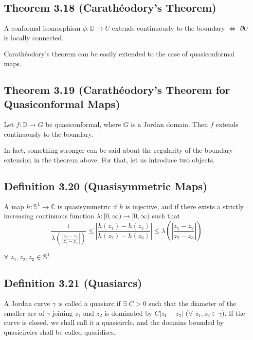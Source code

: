 \documentclass[11pt,a4paper]{article}
\begin{document}
        \subsection*{Theorem 3.18 (Carath\'eodory's Theorem)} A conformal isomorphism $\phi: \mathbb{D} \rightarrow U$ extends continuously to the boundary $\iff$ $\partial U$ is locally connected.



        Carath\'eodory's theorem can be easily extended to the case of quasiconformal maps.

        \subsection*{Theorem 3.19 (Carath\'eodory's Theorem for Quasiconformal Maps)} Let $f:\mathbb{D}\rightarrow G$ be quasiconformal, where $G$ is a Jordan domain. Then $f$ extends continuously to the boundary.



        In fact, something stronger can be said about the regularity of the boundary extension in the theorem above. For that, let us introduce two objects.

        \subsection*{Definition 3.20 (Quasisymmetric Maps)} A map $h: \mathbb{S}^1 \rightarrow \mathbb{C}$ is quasisymmetric if $h$ is injective, and if there exists a strictly increasing continuous function $\lambda: [0, \infty) \rightarrow [0, \infty)$ such that
        $$\frac{1}{\lambda \left(\left|\frac{z_2 - z_3}{z_1-z_2}\right|\right)} \leq \left|\frac{h(z_1)-h(z_2)}{h(z_2)-h(z_3)}\right| \leq \lambda \left(\left|\frac{z_1-z_2}{z_2-z_3
        }\right|\right)$$

        $\forall$ $z_1, z_2, z_3 \in \mathbb{S}^1$.


        \subsection*{Definition 3.21 (Quasiarcs)} A Jordan curve $\gamma$ is called a quasiarc if $\exists$ $C>0$ such that the diameter of the smaller arc of $\gamma$ joining $z_1$ and $z_2$ is dominated by $C|z_1 - z_2|$ ($\forall$ $z_1, z_2 \in \gamma$). If the curve is closed, we shall call it a quasicircle, and the domains bounded by quasicircles shall be called quasidiscs.
\end{document}
